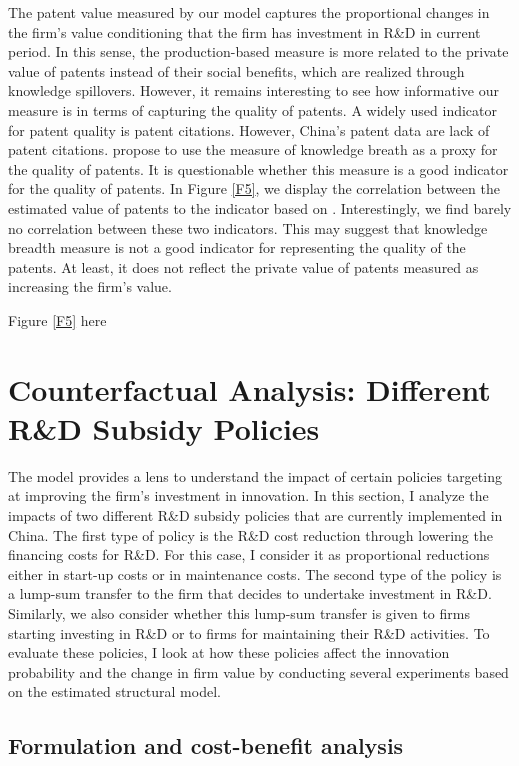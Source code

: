 \documentclass[English]{article}
\begin{document}
The patent value measured by our model captures the proportional changes in the firm's value conditioning that the firm has investment in R\&D in current period. In this sense, the production-based measure is more related to the private value of patents instead of their social benefits, which are realized through knowledge spillovers. However, it remains interesting to see how informative our measure is in terms of capturing the quality of patents. A widely used indicator for patent quality is patent citations. However, China's patent data are lack of patent citations. \citet{Dang2015} propose to use the measure of knowledge breath as a proxy for the quality of patents. It is questionable whether this measure is a good indicator for the quality of patents. In Figure \ref{F5}, we display the correlation between the estimated value of patents to the indicator based on \citet{Dang2015}. Interestingly, we find barely no correlation between these two indicators. This may suggest that knowledge breadth measure is not a good indicator for representing the quality of the patents. At least, it does not reflect the private value of patents measured as increasing the firm's value.

\begin{center}
Figure \ref{F5} here
\end{center}


\section{Counterfactual Analysis: Different R\&D Subsidy Policies}
 The model provides a lens to understand the impact of certain policies targeting at improving the firm's investment in innovation. In this section, I analyze the impacts of two different R\&D subsidy policies that are currently implemented in China. The first type of policy is the R\&D cost reduction through lowering the financing costs for R\&D. For this case, I consider it as proportional reductions either in start-up costs or in maintenance costs. The second type of the policy is a lump-sum transfer to the firm that decides to undertake investment in R\&D. Similarly, we also consider whether this lump-sum transfer is given to firms starting investing in R\&D or to firms for maintaining their R\&D activities. To evaluate these policies, I look at how these policies affect the innovation probability and the change in firm value by conducting several experiments based on the estimated structural model. 
 
\subsection{Formulation and cost-benefit analysis}  
\end{document}
